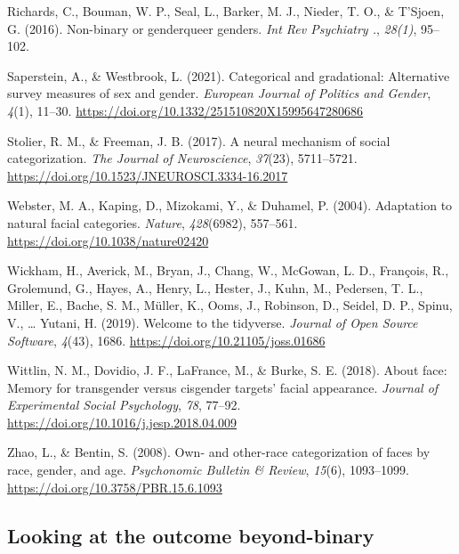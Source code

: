\documentclass[
  man]{apa7}
\newlength{\cslhangindent}
\newlength{\cslentryspacingunit} %
\newenvironment{CSLReferences}[2] %
 {%
  \setlength{\parindent}{0pt}
  \ifodd #1
  \let\oldpar\par
  \def\par{\hangindent=\cslhangindent\oldpar}
  \fi
  \setlength{\parskip}{#2\cslentryspacingunit}
 }%
 {}
\begin{document}
\begin{CSLReferences}{1}{0}
\leavevmode{}%
Richards, C., Bouman, W. P., Seal, L., Barker, M. J., Nieder, T. O., \& T'Sjoen, G. (2016). Non-binary or genderqueer genders. \emph{Int Rev Psychiatry .}, \emph{28(1)}, 95--102.

\leavevmode{}%
Saperstein, A., \& Westbrook, L. (2021). Categorical and gradational: Alternative survey measures of sex and gender. \emph{European Journal of Politics and Gender}, \emph{4}(1), 11--30. \url{https://doi.org/10.1332/251510820X15995647280686}

\leavevmode{}%
Stolier, R. M., \& Freeman, J. B. (2017). A neural mechanism of social categorization. \emph{The Journal of Neuroscience}, \emph{37}(23), 5711--5721. \url{https://doi.org/10.1523/JNEUROSCI.3334-16.2017}

\leavevmode{}%
Webster, M. A., Kaping, D., Mizokami, Y., \& Duhamel, P. (2004). Adaptation to natural facial categories. \emph{Nature}, \emph{428}(6982), 557--561. \url{https://doi.org/10.1038/nature02420}

\leavevmode{}%
Wickham, H., Averick, M., Bryan, J., Chang, W., McGowan, L. D., François, R., Grolemund, G., Hayes, A., Henry, L., Hester, J., Kuhn, M., Pedersen, T. L., Miller, E., Bache, S. M., Müller, K., Ooms, J., Robinson, D., Seidel, D. P., Spinu, V., \ldots{} Yutani, H. (2019). Welcome to the {tidyverse}. \emph{Journal of Open Source Software}, \emph{4}(43), 1686. \url{https://doi.org/10.21105/joss.01686}

\leavevmode{}%
Wittlin, N. M., Dovidio, J. F., LaFrance, M., \& Burke, S. E. (2018). About face: Memory for transgender versus cisgender targets' facial appearance. \emph{Journal of Experimental Social Psychology}, \emph{78}, 77--92. \url{https://doi.org/10.1016/j.jesp.2018.04.009}

\leavevmode{}%
Zhao, L., \& Bentin, S. (2008). Own- and other-race categorization of faces by race, gender, and age. \emph{Psychonomic Bulletin \& Review}, \emph{15}(6), 1093--1099. \url{https://doi.org/10.3758/PBR.15.6.1093}

\end{CSLReferences}

\hypertarget{looking-at-the-outcome-beyond-binary}{%
\subsection{Looking at the outcome beyond-binary}\label{looking-at-the-outcome-beyond-binary}}
\end{document}
